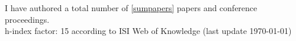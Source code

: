 \begin{publications}
I have authored a total number of \ref{sumpapers} papers and
conference proceedings. \\
h-index factor: 15 according to ISI Web of Knowledge (last update \today)

\end{publications}

